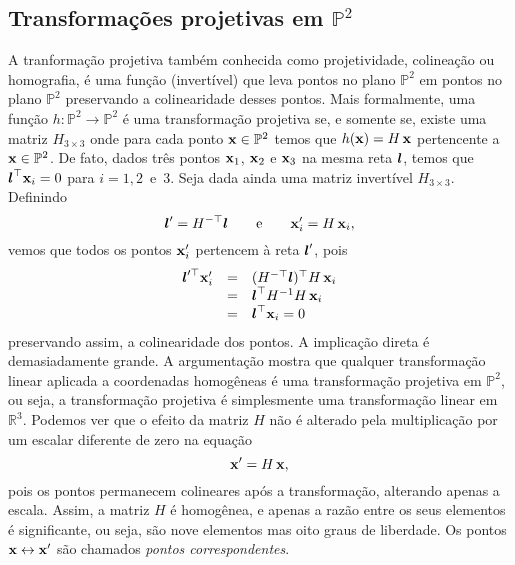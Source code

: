 \subsection{Transformações projetivas em $\mathbb{P}^2$}\label{sec.trans-proj-H}

A tranformação projetiva também conhecida como projetividade, colineação ou homografia,  é uma função (invertível) que leva pontos no plano $\mathbb{P}^2$ em pontos no plano $\mathbb{P}^2$ preservando a colinearidade desses pontos. Mais formalmente, uma função $h:\mathbb{P}^2\rightarrow\mathbb{P}^2$ é uma transformação projetiva se, e somente se, existe uma matriz $H_{3\times3}$ onde para cada ponto $\mathbf{x}\in\mathbb{P}^2$ temos que $h(\mathbf{x})=H\,\mathbf{x}$ pertencente a $\mathbf{x}\in\mathbb{P}^2$. De fato, dados três pontos $\mathbf{x}_1$, $\mathbf{x}_2$ e $\mathbf{x}_3$ na mesma reta $\boldsymbol{l}$, temos que $\boldsymbol{l}^\top\mathbf{x}_i=0$ para $i=1,2 \,\,\,\text{e}\,\,\, 3$. Seja dada ainda uma matriz invertível $H_{3\times3}$. Definindo
\begin{equation*}
\boldsymbol{l}'=H^{-\top}\boldsymbol{l} \qquad\text{e}\qquad \mathbf{x}'_i=H\,\mathbf{x}_i,
\end{equation*}
vemos que todos os pontos $\mathbf{x}'_i$ pertencem à reta $\boldsymbol{l}'$, pois
\begin{equation*}
\begin{array}{rcl}
\boldsymbol{l}'^\top\mathbf{x}'_i&=&(H^{-\top}\boldsymbol{l})^\top H\,\mathbf{x}_i\\
&=&\boldsymbol{l}^\top H^{-1}H\,\mathbf{x}_i\\
&=&\boldsymbol{l}^\top\mathbf{x}_i=0
\end{array}
\end{equation*}
preservando assim, a colinearidade dos pontos. A implicação direta é demasiadamente grande. A argumentação mostra que qualquer transformação linear aplicada a coordenadas homogêneas é uma transformação projetiva em $\mathbb{P}^2$, ou seja, a transformação projetiva é simplesmente uma transformação linear em $\mathbb{R}^3$. Podemos ver que o efeito da matriz $H$ não é alterado pela multiplicação por um escalar diferente de zero na equação
\begin{equation*}
\mathbf{x}'=H\,\mathbf{x},
\end{equation*}
pois os pontos permanecem colineares após a transformação, alterando apenas a escala. Assim, a matriz $H$ é homogênea, e apenas a razão entre os seus elementos é significante, ou seja, são nove elementos mas oito graus de liberdade. Os pontos $\mathbf{x}\leftrightarrow\mathbf{x}'$ são chamados {\it pontos correspondentes}.\\

